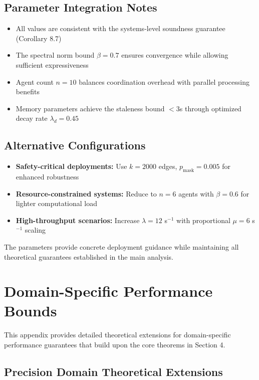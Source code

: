 \documentclass{article}
\begin{document}
\subsection{Parameter Integration Notes}

\begin{itemize}
\item All values are consistent with the systems-level soundness guarantee (Corollary 8.7)
\item The spectral norm bound $\beta = 0.7$ ensures convergence while allowing sufficient expressiveness
\item Agent count $n = 10$ balances coordination overhead with parallel processing benefits
\item Memory parameters achieve the staleness bound $< 3$s through optimized decay rate $\lambda_d = 0.45$
\end{itemize}

\subsection{Alternative Configurations}

\begin{itemize}
\item \textbf{Safety-critical deployments:} Use $k = 2000$ edges, $p_{\text{mask}} = 0.005$ for enhanced robustness
\item \textbf{Resource-constrained systems:} Reduce to $n = 6$ agents with $\beta = 0.6$ for lighter computational load
\item \textbf{High-throughput scenarios:} Increase $\lambda = 12$ s$^{-1}$ with proportional $\mu = 6$ s$^{-1}$ scaling
\end{itemize}

The parameters provide concrete deployment guidance while maintaining all theoretical guarantees established in the main analysis.

\section{Domain-Specific Performance Bounds}

This appendix provides detailed theoretical extensions for domain-specific performance guarantees that build upon the core theorems in Section 4.

\subsection{Precision Domain Theoretical Extensions}
\end{document}
